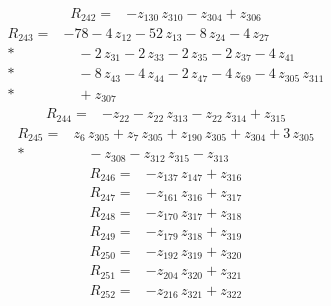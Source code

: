 \documentclass[10pt]{article}
\begin{document}
\begin{align*}
R_{242}={}& - z_{130}\,z_{310} - z_{304} + z_{306}
\end{align*}
\begin{align*}
R_{243}={}& - 78 - 4\,z_{12} - 52\,z_{13} - 8\,z_{24} - 4\,z_{27} \\*
&\quad - 2\,z_{31} - 2\,z_{33} - 2\,z_{35} - 2\,z_{37} - 4\,z_{41} \\*
&\quad - 8\,z_{43} - 4\,z_{44} - 2\,z_{47} - 4\,z_{69} - 4\,z_{305}\,z_{311} \\*
&\quad + z_{307}
\end{align*}
\begin{align*}
R_{244}={}& - z_{22} - z_{22}\,z_{313} - z_{22}\,z_{314} + z_{315}
\end{align*}
\begin{align*}
R_{245}={}& z_{6}\,z_{305} + z_{7}\,z_{305} + z_{190}\,z_{305} + z_{304} + 3\,z_{305} \\*
&\quad - z_{308} - z_{312}\,z_{315} - z_{313}
\end{align*}
\begin{align*}
R_{246}={}& - z_{137}\,z_{147} + z_{316}
\end{align*}
\begin{align*}
R_{247}={}& - z_{161}\,z_{316} + z_{317}
\end{align*}
\begin{align*}
R_{248}={}& - z_{170}\,z_{317} + z_{318}
\end{align*}
\begin{align*}
R_{249}={}& - z_{179}\,z_{318} + z_{319}
\end{align*}
\begin{align*}
R_{250}={}& - z_{192}\,z_{319} + z_{320}
\end{align*}
\begin{align*}
R_{251}={}& - z_{204}\,z_{320} + z_{321}
\end{align*}
\begin{align*}
R_{252}={}& - z_{216}\,z_{321} + z_{322}
\end{align*}
\end{document}
